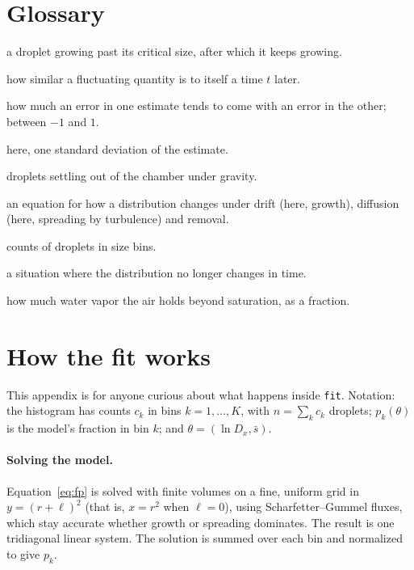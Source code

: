 \documentclass[11pt]{article}
\newcommand{\sbar}{\bar s}
\newcommand{\Dx}{D_x}
\newcommand{\code}[1]{\texttt{#1}}
\begin{document}
\appendix

\section{Glossary}
\begin{description}[itemsep=2pt,font=\normalfont\bfseries]
\item[Activation] a droplet growing past its critical size, after which it keeps growing.
\item[Autocorrelation] how similar a fluctuating quantity is to itself a time $t$ later.
\item[Correlation (of estimates)] how much an error in one estimate tends to come with an error in the
other; between $-1$ and $1$.
\item[Error bar] here, one standard deviation of the estimate.
\item[Fallout] droplets settling out of the chamber under gravity.
\item[Fokker--Planck equation] an equation for how a distribution changes under drift (here, growth),
diffusion (here, spreading by turbulence) and removal.
\item[Histogram] counts of droplets in size bins.
\item[Steady state] a situation where the distribution no longer changes in time.
\item[Supersaturation] how much water vapor the air holds beyond saturation, as a fraction.
\end{description}

\section{How the fit works}\label{app:how}

This appendix is for anyone curious about what happens inside \code{fit}. Notation: the histogram has
counts $c_k$ in bins $k = 1,\dots,K$, with $n = \sum_k c_k$ droplets; $p_k(\theta)$ is the model's fraction
in bin $k$; and $\theta = (\ln\Dx, \sbar)$.

\paragraph{Solving the model.} Equation~\eqref{eq:fp} is solved with finite volumes on a fine, uniform grid
in $y = (r+\ell)^2$ (that is, $x = r^2$ when $\ell = 0$), using Scharfetter--Gummel fluxes, which stay accurate whether growth or spreading dominates.
The result is one tridiagonal linear system. The solution is summed over each bin and normalized to give
$p_k$.
\end{document}

